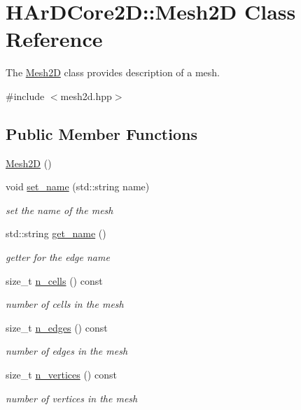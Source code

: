 \hypertarget{classHArDCore2D_1_1Mesh2D}{}\section{H\+Ar\+D\+Core2D\+:\+:Mesh2D Class Reference}
\label{classHArDCore2D_1_1Mesh2D}


The \hyperlink{classHArDCore2D_1_1Mesh2D}{Mesh2D} class provides description of a mesh.  




{\ttfamily \#include $<$mesh2d.\+hpp$>$}

\subsection*{Public Member Functions}
\begin{DoxyCompactItemize}
\item 
\hyperlink{classHArDCore2D_1_1Mesh2D_a04b6cd67a13e59ec44be0b19739610e7}{Mesh2D} ()
\item 
void \hyperlink{group__Mesh2D_ga76daba60a0d68cbc21605cf997e5219c}{set\+\_\+name} (std\+::string name)
\begin{DoxyCompactList}\small\item\em set the name of the mesh \end{DoxyCompactList}\item 
std\+::string \hyperlink{group__Mesh2D_gaba40c4bf2f22422ab55d87d7d6029e3b}{get\+\_\+name} ()
\begin{DoxyCompactList}\small\item\em getter for the edge name \end{DoxyCompactList}\item 
size\+\_\+t \hyperlink{group__Mesh2D_ga49d8009eeb74fd880ef9bb61c37fa672}{n\+\_\+cells} () const
\begin{DoxyCompactList}\small\item\em number of cells in the mesh \end{DoxyCompactList}\item 
size\+\_\+t \hyperlink{group__Mesh2D_ga28758c0eb5e8ce4e0b43c35071a924ef}{n\+\_\+edges} () const
\begin{DoxyCompactList}\small\item\em number of edges in the mesh \end{DoxyCompactList}\item 
size\+\_\+t \hyperlink{group__Mesh2D_ga3b1e13201d9d23cd835509cc36d28b64}{n\+\_\+vertices} () const
\begin{DoxyCompactList}\small\item\em number of vertices in the mesh \end{DoxyCompactList}\item 

\end{DoxyCompactItemize}
